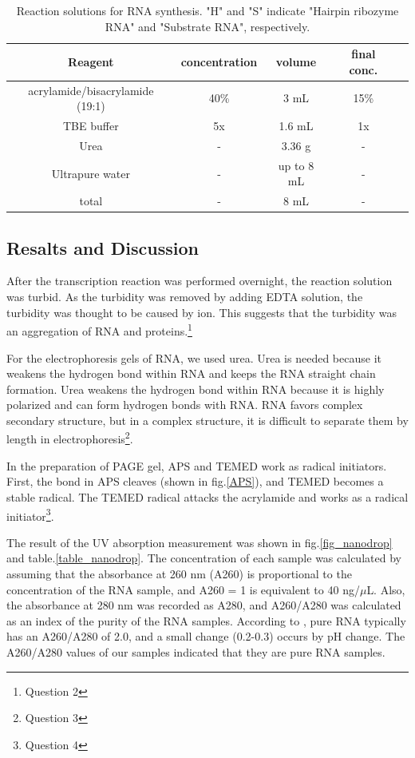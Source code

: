 \documentclass{ltjsarticle}
\theoremstyle{definition}
\numberwithin{equation}{section}
\begin{document}
\begin{table}[htp]
\caption{Reaction solutions for RNA synthesis. "H" and "S" indicate "Hairpin ribozyme RNA" and "Substrate RNA", respectively.}
\begin{center}
\begin{tabular}{ccccc}
Reagent & concentration & volume & final conc. \\ \hline\hline
acrylamide/bisacrylamide (19:1) & 40\% & 3 mL & 15\%\\ 
TBE buffer & 5x & 1.6 mL & 1x \\
Urea & - & 3.36 g & - \\
Ultrapure water & - & up to 8 mL & -\\ \hline
total & - & 8 mL & - 
\end{tabular}
\end{center}
\label{mix_gel}
\end{table}%



\subsection{Resalts and Discussion}
After the transcription reaction was performed overnight, the reaction solution was turbid. As the turbidity was removed by adding EDTA solution, the turbidity was thought to be caused by  ion. This suggests that the turbidity was an aggregation of RNA and proteins.\footnote{Question 2}

For the electrophoresis gels of RNA, we used urea. Urea is needed because it weakens the hydrogen bond within RNA and keeps the RNA straight chain formation. Urea weakens the hydrogen bond within RNA because it is highly polarized and can form hydrogen bonds with RNA. 
RNA favors complex secondary structure, but in a complex structure, it is difficult to separate them by length in electrophoresis\footnote{Question 3}.
 
In the preparation of PAGE gel, APS and TEMED work as radical initiators. First, the  bond in APS cleaves (shown in fig.\ref{APS}), and TEMED becomes a stable radical. The TEMED radical attacks the acrylamide and works as a radical initiator\footnote{Question 4}.

The result of the UV absorption measurement was shown in fig.\ref{fig_nanodrop} and table.\ref{table_nanodrop}. The concentration of each sample was calculated by assuming that the absorbance at 260 nm (A260) is proportional to the concentration of the RNA sample, and A260 = 1 is equivalent to 40 ng/$\mu$L.  Also, the absorbance at 280 nm was recorded as A280, and A260/A280 was calculated as an index of the purity of the RNA samples. According to \cite{thermo}, pure RNA typically has an A260/A280 of 2.0, and a small change (0.2-0.3) occurs by pH change. The A260/A280 values of our samples indicated that they are pure RNA samples.
\end{document}
